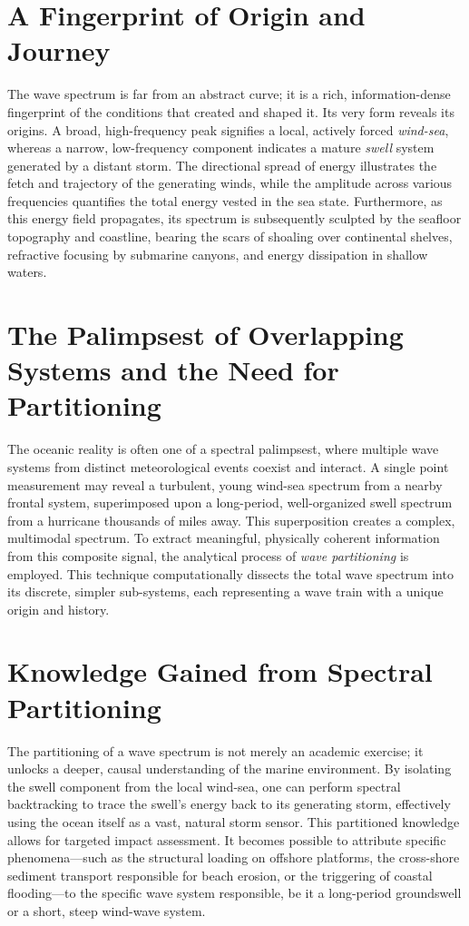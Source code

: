 \documentclass[journal,10pt,twocolumn]{IEEEtran}
\begin{document}
    \section{A Fingerprint of Origin and Journey}

    The wave spectrum is far from an abstract curve; it is a rich, information-dense fingerprint of the conditions that created and shaped it. Its very form reveals its origins. A broad, high-frequency peak signifies a local, actively forced \textit{wind-sea}, whereas a narrow, low-frequency component indicates a mature \textit{swell} system generated by a distant storm. The directional spread of energy illustrates the fetch and trajectory of the generating winds, while the amplitude across various frequencies quantifies the total energy vested in the sea state. Furthermore, as this energy field propagates, its spectrum is subsequently sculpted by the seafloor topography and coastline, bearing the scars of shoaling over continental shelves, refractive focusing by submarine canyons, and energy dissipation in shallow waters.

    \section{The Palimpsest of Overlapping Systems and the Need for Partitioning}

    The oceanic reality is often one of a spectral palimpsest, where multiple wave systems from distinct meteorological events coexist and interact. A single point measurement may reveal a turbulent, young wind-sea spectrum from a nearby frontal system, superimposed upon a long-period, well-organized swell spectrum from a hurricane thousands of miles away. This superposition creates a complex, multimodal spectrum. To extract meaningful, physically coherent information from this composite signal, the analytical process of \textit{wave partitioning} is employed. This technique computationally dissects the total wave spectrum into its discrete, simpler sub-systems, each representing a wave train with a unique origin and history.

    \section{Knowledge Gained from Spectral Partitioning}

    The partitioning of a wave spectrum is not merely an academic exercise; it unlocks a deeper, causal understanding of the marine environment. By isolating the swell component from the local wind-sea, one can perform spectral backtracking to trace the swell's energy back to its generating storm, effectively using the ocean itself as a vast, natural storm sensor. This partitioned knowledge allows for targeted impact assessment. It becomes possible to attribute specific phenomena---such as the structural loading on offshore platforms, the cross-shore sediment transport responsible for beach erosion, or the triggering of coastal flooding---to the specific wave system responsible, be it a long-period groundswell or a short, steep wind-wave system.
\end{document}

